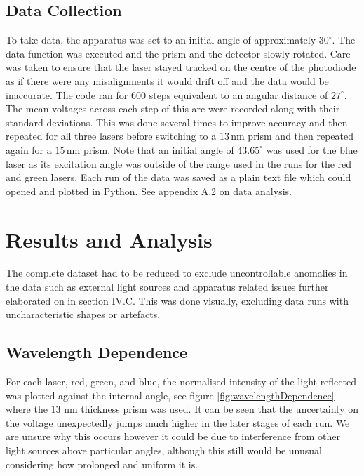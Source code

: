 \documentclass[%
reprint,
amsmath,amssymb,
aps,
]{revtex4-2}
\begin{document}
		\subsection{Data Collection}
			To take data, the apparatus was set to an initial angle of approximately $30^\circ$. The data function was executed and the prism and the detector slowly rotated. Care was taken to ensure that the laser stayed tracked on the centre of the photodiode as if there were any misalignments it would drift off and the data would be inaccurate. The code ran for $600$ steps equivalent to an angular distance of $27^\circ$. The mean voltages across each step of this arc were recorded along with their standard deviations. This was done several times to improve accuracy and then repeated for all three lasers before switching to a $13\,\text{nm}$ prism and then repeated again for a $15\,\text{nm}$ prism. Note that an initial angle of $43.65^\circ$ was used for the blue laser as its excitation angle was outside of the range used in the runs for the red and green lasers. Each run of the data was saved as a plain text file which could opened and plotted in Python. See appendix A.2 on data analysis.
		
		
		
	
	\section{Results and Analysis}
		The complete dataset had to be reduced to exclude uncontrollable anomalies in the data such as external light sources and apparatus related issues further elaborated on in section IV.C. This was done visually, excluding data runs with uncharacteristic shapes or artefacts.
		
		\subsection{Wavelength Dependence}
		
			For each laser, red, green, and blue, the normalised intensity of the light reflected was plotted against the internal angle, see figure \ref{fig:wavelengthDependence} where the 13 nm thickness prism was used. It can be seen that the uncertainty on the voltage unexpectedly jumps much higher in the later stages of each run. We are unsure why this occurs however it could be due to interference from other light sources above particular angles, although this still would be unusual considering how prolonged and uniform it is. \\
			
\end{document}
